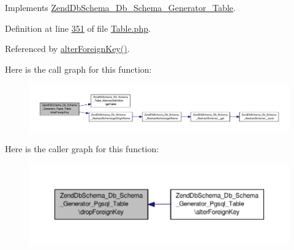 Implements \hyperlink{interfaceZendDbSchema__Db__Schema__Generator__Table_a189e95138e1281c4722b6610b4313b67}{Zend\-Db\-Schema\-\_\-\-Db\-\_\-\-Schema\-\_\-\-Generator\-\_\-\-Table}.



Definition at line \hyperlink{Generator_2Pgsql_2Table_8php_source_l00351}{351} of file \hyperlink{Generator_2Pgsql_2Table_8php_source}{Table.\-php}.



Referenced by \hyperlink{Generator_2Pgsql_2Table_8php_source_l00335}{alter\-Foreign\-Key()}.



Here is the call graph for this function\-:\nopagebreak
\begin{figure}[H]
\begin{center}
\leavevmode
\includegraphics[width=350pt]{classZendDbSchema__Db__Schema__Generator__Pgsql__Table_aab407f272f8993d722e31c277ce0f974_cgraph}
\end{center}
\end{figure}




Here is the caller graph for this function\-:\nopagebreak
\begin{figure}[H]
\begin{center}
\leavevmode
\includegraphics[width=350pt]{classZendDbSchema__Db__Schema__Generator__Pgsql__Table_aab407f272f8993d722e31c277ce0f974_icgraph}
\end{center}
\end{figure}


